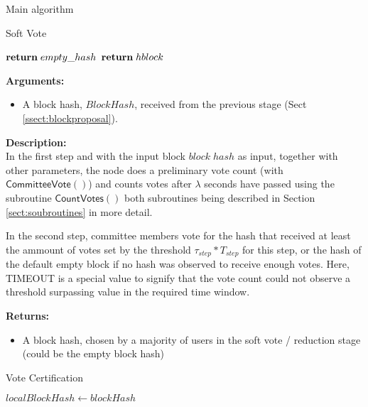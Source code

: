 \documentclass[10pt,a4paper]{article}
\begin{document}
\begin{section}{Main algorithm}
\begin{subsection}{Soft Vote}
\begin{algorithm}[H]
\begin{algorithmic}[H]
        {$\Return\; empty\_hash$}
        {$\Return\; hblock$}
    \EndFunction
    \end{algorithmic}
    \caption{\underline{Soft Vote}}
\end{algorithm}

\noindent \textbf{Arguments:}
\begin{itemize}
    \item A block hash, $BlockHash$, received from the previous stage (Sect \ref{ssect:blockproposal}).
  \end{itemize}

\noindent \textbf{Description:}\\
In the first step and with the input block $block\; hash$ as input, together
with other parameters, the node does a preliminary vote count (with $\mathsf{CommitteeVote}()$) and counts votes 
after $\lambda$ seconds have passed using the subroutine $\mathsf{CountVotes}()$ \-both 
subroutines being described in Section \ref{sect:soubroutines} in more detail.

In the second step, committee members vote for the hash that received at least the 
ammount of votes set by the threshold $\tau_{step} * T_{step}$ for this step, or the hash of the default empty
block if no hash was observed to receive enough votes. Here, TIMEOUT is a special value to signify that the vote count
could not observe a threshold surpassing value in the required time window.


\noindent \textbf{Returns:}
\begin{itemize}
    \item A block hash, chosen by a majority of users in the soft vote / reduction stage 
    (could be the empty block hash)
\end{itemize}

\end{subsection}
\begin{subsection}{Vote Certification}\label{ssect:certifyvote}
    \begin{algorithm}[H]
        \begin{algorithmic}[H]
        \State $localBlockHash \gets blockHash$
    

\end{algorithmic}
\end{algorithm}
\end{subsection}
\end{section}
\end{document}
